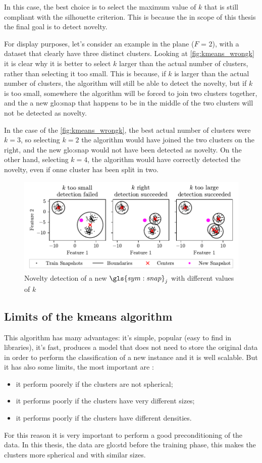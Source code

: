 In this case, the best choice is to select the maximum value of $k$ that is still compliant with the silhouette criterion. This is because the in scope of this thesis the final goal is to detect novelty. 

For display purposes, let's consider an example in the plane ($F$ = 2), with a dataset that clearly have three distinct clusters. Looking at \autoref{fig:kmeans_wrongk} it is clear why it is better to select $k$ larger than the actual number of clusters, rather than selecting it too small. This is because, if $k$ is larger than the actual number of clusters, the algorithm will still be able to detect the novelty, but if $k$ is too small, somewhere the algorithm will be forced to join two clusters together, and the a new {\gls{glo:snap}} that happens to be in the middle of the two clusters will not be detected as novelty. 

In the case of the \autoref{fig:kmeans_wrongk}, the best actual number of clusters were $k=3$, so selecting $k=2$ the algorithm would have joined the two clusters on the right, and the new {\gls{glo:snap}} would not have been detected as novelty. On the other hand, selecting $k=4$, the algorithm would have correctly detected the novelty, even if onne cluster has been split in two.

\begin{figure}
  \centering
  \includegraphics[width=\textwidth]{images/Kmeans_wrongk.pdf}
  \caption{Novelty detection of a new $\gls{sym:snap}_j$ with different values of $k$}
  \label{fig:kmeans_wrongk}
\end{figure}


\subsection{Limits of the kmeans algorithm}
This algorithm has many advantages: it's simple, popular (easy to find in libraries), it's fast, produces a model that does not need to store the original data in order to perform the classification of a new instance and it is well scalable. But it has also some limits, the most important are \cite[p273]{hands-on-geron2022}:
\begin{itemize}
  \item it perform poorely if the clusters are not spherical;
  \item it performs poorly if the clusters have very different sizes;
  \item it performs poorly if the clusters have different densities.
\end{itemize}

For this reason it is very important to perform a good preconditioning of the data. In this thesis, the data are \gls{glo:std} before the training phase, this makes the clusters more spherical and with similar sizes. 



